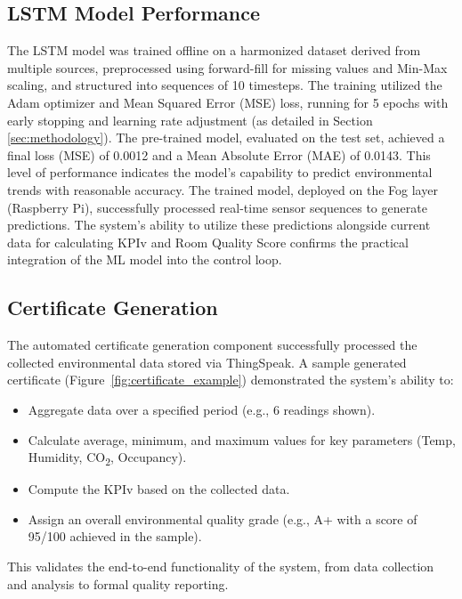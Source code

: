 \subsection{LSTM Model Performance}
The LSTM model was trained offline on a harmonized dataset derived from multiple sources, preprocessed using forward-fill for missing values and Min-Max scaling, and structured into sequences of 10 timesteps. The training utilized the Adam optimizer and Mean Squared Error (MSE) loss, running for 5 epochs with early stopping and learning rate adjustment (as detailed in Section \ref{sec:methodology}). The pre-trained model, evaluated on the test set, achieved a final loss (MSE) of 0.0012 and a Mean Absolute Error (MAE) of 0.0143. This level of performance indicates the model's capability to predict environmental trends with reasonable accuracy. The trained model, deployed on the Fog layer (Raspberry Pi), successfully processed real-time sensor sequences to generate predictions. The system's ability to utilize these predictions alongside current data for calculating KPIv and Room Quality Score confirms the practical integration of the ML model into the control loop.

\subsection{Certificate Generation}
The automated certificate generation component successfully processed the collected environmental data stored via ThingSpeak. A sample generated certificate (Figure~\ref{fig:certificate_example}) demonstrated the system's ability to:
\begin{itemize}
    \item Aggregate data over a specified period (e.g., 6 readings shown).
    \item Calculate average, minimum, and maximum values for key parameters (Temp, Humidity, CO\textsubscript{2}, Occupancy).
    \item Compute the KPIv based on the collected data.
    \item Assign an overall environmental quality grade (e.g., A+ with a score of 95/100 achieved in the sample).
\end{itemize}
This validates the end-to-end functionality of the system, from data collection and analysis to formal quality reporting.

